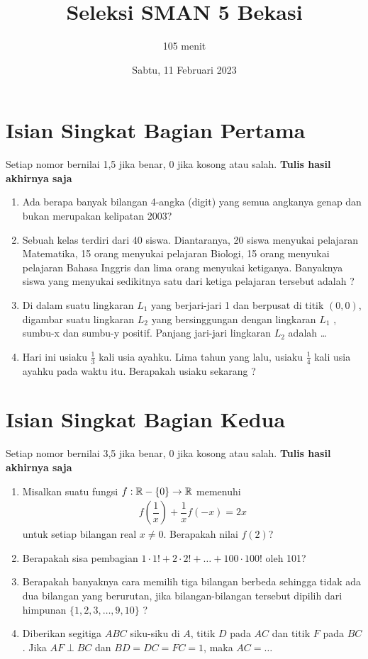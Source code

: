 \documentclass[11pt]{scrartcl}
\title{Seleksi SMAN 5 Bekasi}
\author{105 menit}
\date{Sabtu, 11 Februari 2023}
\begin{document}
\maketitle
\section{Isian Singkat Bagian Pertama}
Setiap nomor bernilai 1,5 jika benar, 0 jika kosong atau salah. \textbf{Tulis hasil akhirnya saja}
\begin{enumerate}
\item Ada berapa banyak bilangan 4-angka (digit) yang semua angkanya genap dan bukan merupakan kelipatan 2003?

\item Sebuah kelas terdiri dari 40 siswa. Diantaranya, 20 siswa menyukai pelajaran Matematika, 15 orang menyukai pelajaran Biologi, 15 orang menyukai pelajaran Bahasa Inggris dan lima orang menyukai ketiganya. Banyaknya siswa yang menyukai sedikitnya satu dari ketiga pelajaran tersebut adalah ?

\item Di dalam suatu lingkaran $L_1$ yang berjari-jari 1 dan berpusat di titik $(0,0)$, digambar suatu lingkaran $L_2$ yang bersinggungan dengan lingkaran $L_1$ , sumbu-x dan sumbu-y positif. Panjang jari-jari
lingkaran $L_2$ adalah \dots

\item Hari ini usiaku $\tfrac{1}{3}$ kali usia ayahku. Lima tahun yang lalu, usiaku $\tfrac{1}{4}$ kali usia ayahku pada waktu itu. Berapakah usiaku sekarang ?
\end{enumerate}

\newpage
\section{Isian Singkat Bagian Kedua}
Setiap nomor bernilai 3,5 jika benar, 0 jika kosong atau salah. \textbf{Tulis hasil akhirnya saja}

\begin{enumerate}
    \item Misalkan suatu fungsi $f: \mathbb R-\{0\} \to \mathbb R$ memenuhi
\begin{align*}
    f\left(\dfrac{1}{x}\right)+\dfrac{1}{x}f\left(-x\right)=2x
\end{align*}
untuk setiap bilangan real $x \neq 0$. Berapakah nilai $f(2)$? 

    \item Berapakah sisa pembagian $1\cdot 1!+2 \cdot 2! + \dots + 100 \cdot 100!$ oleh 101?

    \item Berapakah banyaknya cara memilih tiga bilangan berbeda sehingga tidak ada dua bilangan yang berurutan, jika bilangan-bilangan tersebut dipilih dari himpunan $\{1, 2, 3,\dots, 9, 10 \}$ ?

    \item Diberikan segitiga $ABC$ siku-siku di $A$, titik $D$ pada $AC$ dan titik $F$ pada $BC$. Jika $AF \perp BC$ dan $BD=DC=FC=1$, maka $AC= \dots$
\end{enumerate}
\end{document}
